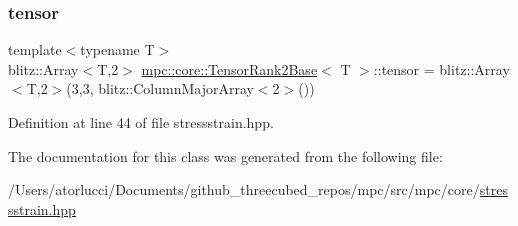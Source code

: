 \subsubsection{\texorpdfstring{tensor}{tensor}}
{\footnotesize\ttfamily template$<$typename T$>$ \\
blitz\+::\+Array$<$T,2$>$ \mbox{\hyperlink{structmpc_1_1core_1_1_tensor_rank2_base}{mpc\+::core\+::\+Tensor\+Rank2\+Base}}$<$ T $>$\+::tensor = blitz\+::\+Array$<$T,2$>$(3,3, blitz\+::\+Column\+Major\+Array$<$2$>$())}



Definition at line 44 of file stressstrain.\+hpp.



The documentation for this class was generated from the following file\+:\begin{DoxyCompactItemize}
\item 
/\+Users/atorlucci/\+Documents/github\+\_\+threecubed\+\_\+repos/mpc/src/mpc/core/\mbox{\hyperlink{stressstrain_8hpp}{stressstrain.\+hpp}}\end{DoxyCompactItemize}
